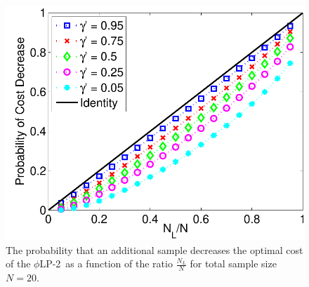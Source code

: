 \documentclass[11pt]{article}
\newcommand{\plp}{$\phi$LP-2}
\begin{document}
\begin{figure}
	\centering
	\includegraphics[width=.5\textwidth]{images/prob_dec_cost_v_nl_n_20}
	\caption{The probability that an additional sample decreases the optimal cost of the \plp\ as a function of the ratio $\frac{N_L}{N}$ for total sample size $N = 20$.}
	\label{fig:prob_cost_decrease_nd_n}
\end{figure}
\end{document}

